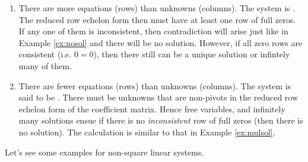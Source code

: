 \begin{enumerate}
\item There are more equations (rows) than unknowns (columns). The system is . The reduced row echelon form then must have at least one row of full zeros. If any one of them is inconsistent, then contradiction will arise just like in Example \ref{ex:nosol} and there will be no solution. However, if all zero rows are consistent (i.e. $0=0$), then there still can be a unique solution or infintely many of them.
\item There are fewer equations (rows) than unknowns (columns). The system is said to be . There must be unknowns that are non-pivots in the reduced row echelon form of the coefficient matrix. Hence free variables, and infinitely many solutions ensue if there is no \textit{inconsistent} row of full zeros (then there is no solution). The calculation is similar to that in Example \ref{ex:mulsol}.
\end{enumerate}
Let's see some examples for non-square linear systems.\
